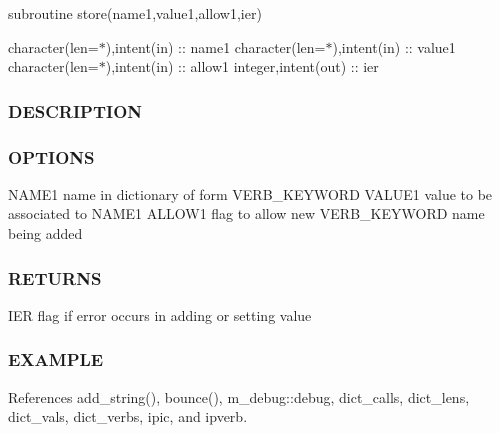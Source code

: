 subroutine store(name1,value1,allow1,ier)

character(len=$\ast$),intent(in) \+:\+: name1 character(len=$\ast$),intent(in) \+:\+: value1 character(len=$\ast$),intent(in) \+:\+: allow1 integer,intent(out) \+:\+: ier

\subsubsection*{D\+E\+S\+C\+R\+I\+P\+T\+I\+ON}

\subsubsection*{O\+P\+T\+I\+O\+NS}

N\+A\+M\+E1 name in dictionary of form V\+E\+R\+B\+\_\+\+K\+E\+Y\+W\+O\+RD V\+A\+L\+U\+E1 value to be associated to N\+A\+M\+E1 A\+L\+L\+O\+W1 flag to allow new V\+E\+R\+B\+\_\+\+K\+E\+Y\+W\+O\+RD name being added

\subsubsection*{R\+E\+T\+U\+R\+NS}

I\+ER flag if error occurs in adding or setting value

\subsubsection*{E\+X\+A\+M\+P\+LE}

References add\+\_\+string(), bounce(), m\+\_\+debug\+::debug, dict\+\_\+calls, dict\+\_\+lens, dict\+\_\+vals, dict\+\_\+verbs, ipic, and ipverb.

